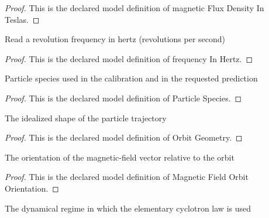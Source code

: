 \begin{proof}
  This is the declared model definition of magnetic Flux Density In Teslas.
\end{proof}
\begin{definition}
  \label{def:physics:phyx-mini-0956:phyxminiproblems-problemphyxmini0956-frequencyinhertz}
  Read a revolution frequency in hertz (revolutions per second)
\end{definition}
\begin{proof}
  This is the declared model definition of frequency In Hertz.
\end{proof}
\begin{definition}
  \label{def:physics:phyx-mini-0956:phyxminiproblems-problemphyxmini0956-particlespecies}
  Particle species used in the calibration and in the requested prediction
\end{definition}
\begin{proof}
  This is the declared model definition of Particle Species.
\end{proof}
\begin{definition}
  \label{def:physics:phyx-mini-0956:phyxminiproblems-problemphyxmini0956-orbitgeometry}
  The idealized shape of the particle trajectory
\end{definition}
\begin{proof}
  This is the declared model definition of Orbit Geometry.
\end{proof}
\begin{definition}
  \label{def:physics:phyx-mini-0956:phyxminiproblems-problemphyxmini0956-magneticfieldorbitorientation}
  The orientation of the magnetic-field vector relative to the orbit
\end{definition}
\begin{proof}
  This is the declared model definition of Magnetic Field Orbit Orientation.
\end{proof}
\begin{definition}
  \label{def:physics:phyx-mini-0956:phyxminiproblems-problemphyxmini0956-cyclotronregime}
  The dynamical regime in which the elementary cyclotron law is used
\end{definition}
